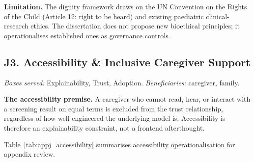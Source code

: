 \noindent\textbf{Limitation.} The dignity framework draws on the UN Convention on the Rights of the Child (Article 12: right to be heard) and existing paediatric clinical-research ethics. The dissertation does not propose new bioethical principles; it operationalises established ones as governance controls.

\subsection*{J3. Accessibility \& Inclusive Caregiver Support}
\label{sec:appj_accessibility}

\noindent\emph{Boxes served:} Explainability, Trust, Adoption. \emph{Beneficiaries:} caregiver, family.

\noindent\textbf{The accessibility premise.} A caregiver who cannot read, hear, or interact with a screening result on equal terms is excluded from the trust relationship, regardless of how well-engineered the underlying model is. Accessibility is therefore an explainability constraint, not a frontend afterthought.

\noindent Table~\ref{tab:appj_accessibility} summarises accessibility operationalisation for appendix review.

